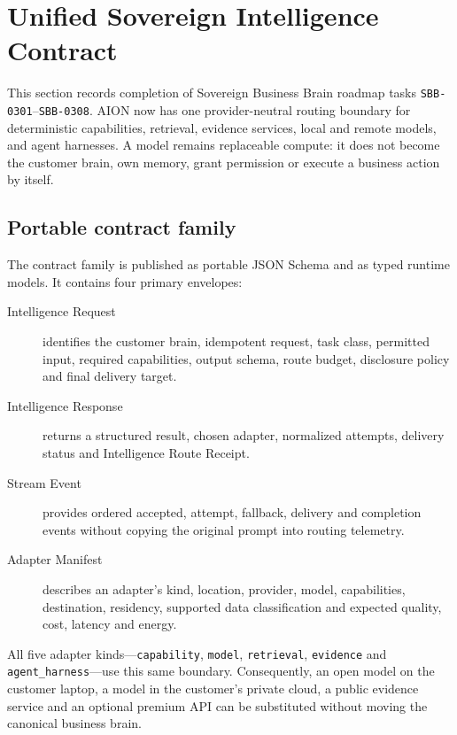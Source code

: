 \section{Unified Sovereign Intelligence Contract}
\label{sec:unified-sovereign-intelligence-contract}

This section records completion of Sovereign Business Brain roadmap tasks
\texttt{SBB-0301}--\texttt{SBB-0308}.  AION now has one provider-neutral routing
boundary for deterministic capabilities, retrieval, evidence services, local and
remote models, and agent harnesses.  A model remains replaceable compute: it does
not become the customer brain, own memory, grant permission or execute a business
action by itself.

\subsection{Portable contract family}

The contract family is published as portable JSON Schema and as typed runtime
models.  It contains four primary envelopes:

\begin{description}
  \item[Intelligence Request] identifies the customer brain, idempotent request,
  task class, permitted input, required capabilities, output schema, route budget,
  disclosure policy and final delivery target.
  \item[Intelligence Response] returns a structured result, chosen adapter,
  normalized attempts, delivery status and Intelligence Route Receipt.
  \item[Stream Event] provides ordered accepted, attempt, fallback, delivery and
  completion events without copying the original prompt into routing telemetry.
  \item[Adapter Manifest] describes an adapter's kind, location, provider, model,
  capabilities, destination, residency, supported data classification and expected
  quality, cost, latency and energy.
\end{description}

All five adapter kinds---\texttt{capability}, \texttt{model}, \texttt{retrieval},
\texttt{evidence} and \texttt{agent\_harness}---use this same boundary.  Consequently,
an open model on the customer laptop, a model in the customer's private cloud, a
public evidence service and an optional premium API can be substituted without
moving the canonical business brain.

